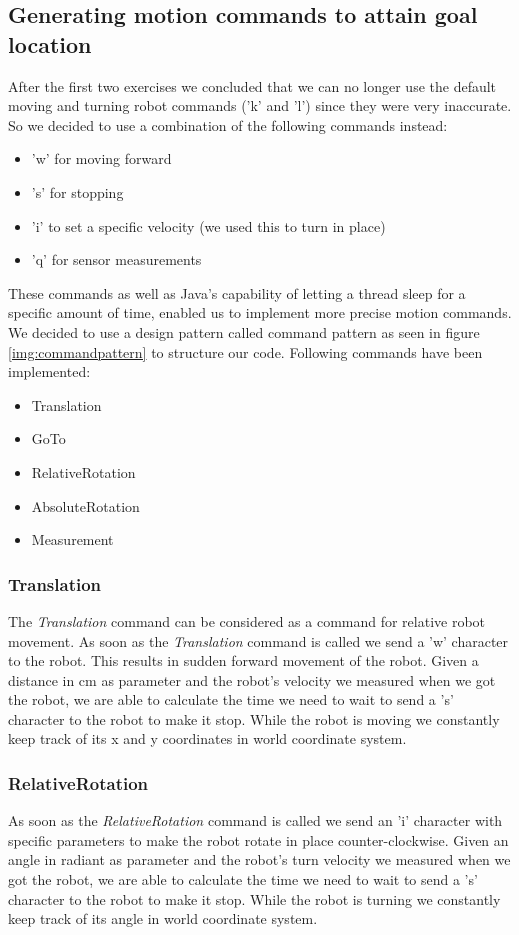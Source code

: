 \documentclass[703030]{./includes/iisreport}
\begin{document}
\subsection{Generating motion commands to attain goal location}
After the first two exercises we concluded that we can no longer use the default
moving and turning robot commands ('k' and 'l') since they were very inaccurate.
So we decided to use a combination of the following commands instead:
\begin{itemize}
	\item 'w' for moving forward
	\item 's' for stopping
	\item 'i' to set a specific velocity (we used this to turn in place)
	\item 'q' for sensor measurements
\end{itemize}
These commands as well as Java's capability of letting a thread sleep for a
specific amount of time, enabled us to implement more precise motion commands.
We decided to use a design pattern called command pattern as seen in figure
\ref{img:commandpattern} to structure our code.
Following commands have been implemented:
\begin{itemize}
	\item Translation
	\item GoTo
	\item RelativeRotation
	\item AbsoluteRotation
	\item Measurement
\end{itemize}

\subsubsection{Translation}
The \emph{Translation} command can be considered as a command for relative robot
movement. As soon as the \emph{Translation} command is called we send a 'w' character
to the robot. This results in sudden forward movement of the robot. Given a
distance in cm as parameter and the robot's velocity we measured when we got the
robot, we are able to calculate the time we need to wait to send a 's' character
to the robot to make it stop. While the robot is moving we constantly keep track
of its x and y coordinates in world coordinate system.

\subsubsection{RelativeRotation}
As soon as the \emph{RelativeRotation} command is called we send an 'i' character 
with specific parameters to make the robot rotate in place counter-clockwise. Given 
an angle in radiant as parameter and the robot's turn velocity we measured when we
got the robot, we are able to calculate the time we need to wait to send a 's'
character to the robot to make it stop. While the robot is turning we constantly
keep track of its angle in world coordinate system.
\end{document}
